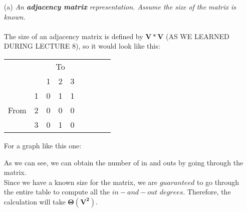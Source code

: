 \documentclass[12pt]{article} \setlength{\oddsidemargin}{0in}
\begin{document}
\begin{enumerate}
\item[(a)]{\textit{An \textbf{adjacency matrix} representation. Assume
      the size of the matrix is known.}}
  \\\\
  The size of an adjacency matrix is defined by  $\mathbf{V*V}$ (AS WE LEARNED DURING LECTURE 8), so it would look like this:

\begin{tabular}{|lr|l|l|l|l|l|l|l} \cline{3-5}
\multicolumn{1}{l}{} && \multicolumn{3}{c|}{To} \\ \cline{3-5}
\multicolumn{1}{l}{} & & 1 & 2 & 3 \\ \hline
\multirow{3}{*}{\begin{sideways}From\end{sideways}}
& \multicolumn{1}{|r|}{1} &  0  & 1  &   1   \\ \cline{2-5}
& \multicolumn{1}{|r|}{2} &  0 & 0  &   0     \\ \cline{2-5}
& \multicolumn{1}{|r|}{3} &  0 &  1 &   0   \\ \hline
\end{tabular}    For a graph like this one:  

As we can see, we can obtain the number of in and outs by going through the matrix.\\
Since we have a known size for the matrix, we are $guaranteed$ to go through the entire table to compute all the $in-and-out$ $degrees$. Therefore, the calculation will take $\mathbf{\Theta (V^2)}$. 
  

\end{enumerate}
\end{document}
